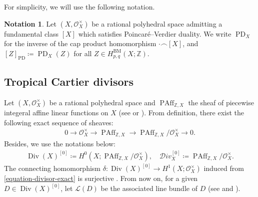 \documentclass[a4paper,dvipdfmx,reqno,12pt]{amsart}
\theoremstyle{definition}
\newtheorem{notation}[theorem]{Notation}
\newcommand{\deq}{\coloneqq}
\newcommand{\opn}[1]{\operatorname{#1}}
\newcommand{\PD}[1]{[#1]_{\mathrm{PD}}}
\numberwithin{equation}{section}
\begin{document}
For simplicity, we will use the following notation.
\begin{notation}
Let $(X,\mathcal{O}_X^{\times})$ be
a rational polyhedral space admitting
a fundamental class $[X]$ which satisfies
Poincar\'e--Verdier duality.
We write $\opn{PD}_X$ for the inverse of
the cap product homomorphism $\cdot \frown [X]$,
and $\PD{Z}\deq \opn{PD}_X(Z)$ for all 
$Z\in H^{\mathrm{BM}}_{p,q}(X;\mathbb{Z})$.
\end{notation}




\subsection{Tropical Cartier divisors}
Let 
$(X,\mathcal{O}_X^{\times})$ be a rational polyhedral space
and $\opn{PAff}_{\mathbb{Z},X}$ the sheaf
of piecewise integeral affine linear functions
on $X$
(see \cite[Definition 4.1]{MR3894860}
or \cite[Definition 3.8 and Remark
3.9]{MR4637248}).
From definition, there exist the following
exact sequence of sheaves:
\begin{align}
\label{equation-divisor-exact}
0 \to  \mathcal{O}_X^{\times} 
\to \opn{PAff}_{\mathbb{Z},X} \to 
\opn{PAff}_{\mathbb{Z},X}/\mathcal{O}_X^{\times}
\to 0.
\end{align}
Besides, we use the notations below:
\begin{align}
\opn{Div}(X)^{[0]}\deq H^{0}(X;
\opn{PAff}_{\mathbb{Z},X}/\mathcal{O}_X^{\times}), 
\quad \mathcal{D}iv_X^{[0]}\deq
\opn{PAff}_{\mathbb{Z},X}/\mathcal{O}_X^{\times}.
\end{align}
The connecting homomorphism 
$\delta \colon \opn{Div}(X)^{[0]}\to 
H^{1}(X;\mathcal{O}_X^{\times})$
induced from \eqref{equation-divisor-exact}
is surjective \cite[Proposition 4.6]{MR3894860}.
From now on, for a given $D\in \opn{Div}(X)^{[0]}$,
let $\mathcal{L}(D)$ be the associated
line bundle of $D$
(see \cite[]{MR4637248} and 
\cite[]{MR2457739}).
\end{document}
